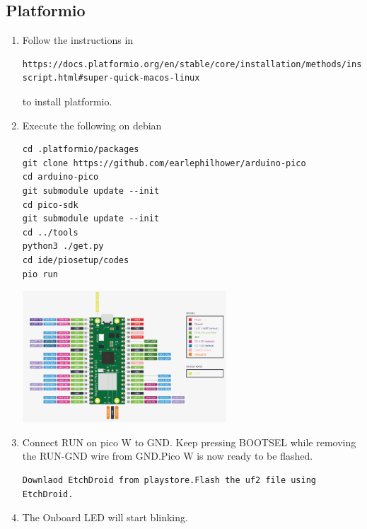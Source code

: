 \subsection{Platformio }
\begin{enumerate}[label=\arabic*.,ref=\theenumi]
\item Follow the instructions in 
\begin{lstlisting}
https://docs.platformio.org/en/stable/core/installation/methods/installer-script.html#super-quick-macos-linux
\end{lstlisting}
to install platformio.
\item Execute the following on debian
\begin{lstlisting}
cd .platformio/packages
git clone https://github.com/earlephilhower/arduino-pico
cd arduino-pico
git submodule update --init
cd pico-sdk
git submodule update --init
cd ../tools
python3 ./get.py
cd ide/piosetup/codes
pio run
\end{lstlisting}
\begin{center}
    \includegraphics[width=0.6\textwidth, height=0.3\textheight]{installation/picowpinout.jpg}
    \vspace{0.5em} %
\end{center}
\vspace{0.5em} %
\item Connect RUN on pico W to GND. Keep pressing BOOTSEL while removing the RUN-GND wire from GND.Pico W is now ready to be flashed.
\begin{lstlisting}
Downlaod EtchDroid from playstore.Flash the uf2 file using EtchDroid.
\end{lstlisting}
\vspace{0.5em} %
\item The Onboard LED will start blinking.
\end{enumerate}




